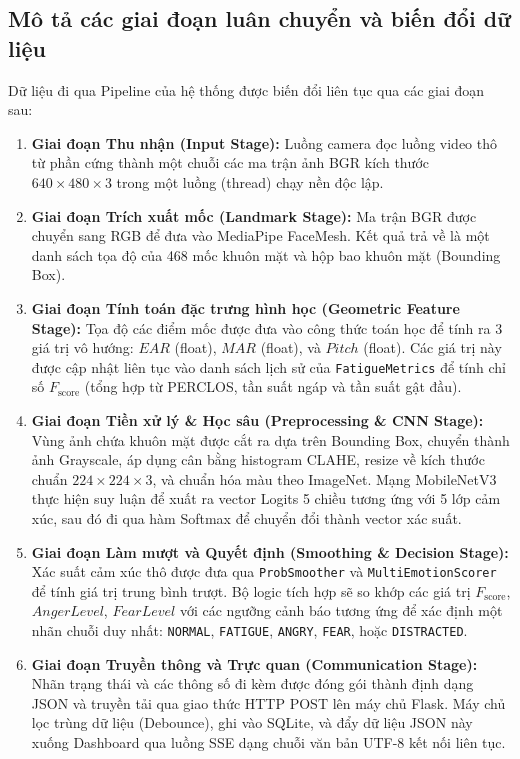 \documentclass[../DoAn.tex]{subfiles}
\begin{document}
\subsection{Mô tả các giai đoạn luân chuyển và biến đổi dữ liệu}
Dữ liệu đi qua Pipeline của hệ thống được biến đổi liên tục qua các giai đoạn sau:
\begin{enumerate}
    \item \textbf{Giai đoạn Thu nhận (Input Stage):} Luồng camera đọc luồng video thô từ phần cứng thành một chuỗi các ma trận ảnh BGR kích thước $640 \times 480 \times 3$ trong một luồng (thread) chạy nền độc lập.
    \item \textbf{Giai đoạn Trích xuất mốc (Landmark Stage):} Ma trận BGR được chuyển sang RGB để đưa vào MediaPipe FaceMesh. Kết quả trả về là một danh sách tọa độ của 468 mốc khuôn mặt và hộp bao khuôn mặt (Bounding Box).
    \item \textbf{Giai đoạn Tính toán đặc trưng hình học (Geometric Feature Stage):} Tọa độ các điểm mốc được đưa vào công thức toán học để tính ra 3 giá trị vô hướng: $EAR$ (float), $MAR$ (float), và $Pitch$ (float). Các giá trị này được cập nhật liên tục vào danh sách lịch sử của \texttt{FatigueMetrics} để tính chỉ số $F_{\text{score}}$ (tổng hợp từ PERCLOS, tần suất ngáp và tần suất gật đầu).
    \item \textbf{Giai đoạn Tiền xử lý \& Học sâu (Preprocessing \& CNN Stage):} Vùng ảnh chứa khuôn mặt được cắt ra dựa trên Bounding Box, chuyển thành ảnh Grayscale, áp dụng cân bằng histogram CLAHE, resize về kích thước chuẩn $224 \times 224 \times 3$, và chuẩn hóa màu theo ImageNet. Mạng MobileNetV3 thực hiện suy luận để xuất ra vector Logits 5 chiều tương ứng với 5 lớp cảm xúc, sau đó đi qua hàm Softmax để chuyển đổi thành vector xác suất.
    \item \textbf{Giai đoạn Làm mượt và Quyết định (Smoothing \& Decision Stage):} Xác suất cảm xúc thô được đưa qua \texttt{ProbSmoother} và \texttt{MultiEmotionScorer} để tính giá trị trung bình trượt. Bộ logic tích hợp sẽ so khớp các giá trị $F_{\text{score}}$, $AngerLevel$, $FearLevel$ với các ngưỡng cảnh báo tương ứng để xác định một nhãn chuỗi duy nhất: \texttt{NORMAL}, \texttt{FATIGUE}, \texttt{ANGRY}, \texttt{FEAR}, hoặc \texttt{DISTRACTED}.
    \item \textbf{Giai đoạn Truyền thông và Trực quan (Communication Stage):} Nhãn trạng thái và các thông số đi kèm được đóng gói thành định dạng JSON và truyền tải qua giao thức HTTP POST lên máy chủ Flask. Máy chủ lọc trùng dữ liệu (Debounce), ghi vào SQLite, và đẩy dữ liệu JSON này xuống Dashboard qua luồng SSE dạng chuỗi văn bản UTF-8 kết nối liên tục.
\end{enumerate}
\end{document}
